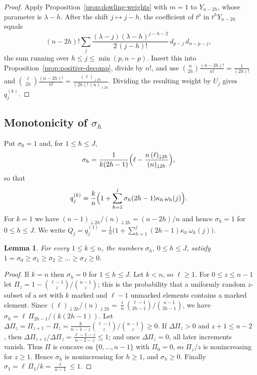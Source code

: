 \documentclass[11pt]{amsart}
\newtheorem{lemma}[theorem]{Lemma}
\theoremstyle{definition}
\theoremstyle{remark}
\numberwithin{equation}{section}
\newcommand{\ff}[2]{(#1)_{\downarrow #2}}
\begin{document}
\begin{proof}
Apply Proposition~\ref{prop:dowling-weights} with $m=1$ to $Y_{n-2h}$, whose parameter is $\lambda-h$. After the shift $j\mapsto j-h$, the coefficient of $t^p$ in $t^hY_{n-2h}$ equals
\[
(n-2h)!\sum_j\frac{(\lambda-j)(\lambda-h)^{j-h-2}}{2\,(j-h)!}\,d_{p-j}\,d_{n-p-j},
\]
the sum running over $h\le j\le\min(p,n-p)$. Insert this into Proposition~\ref{prop:positive-decomp}, divide by $n!$, and use $\binom n{2h}\frac{(n-2h)!}{n!}=\frac1{(2h)!}$ and $\binom\ell{2h}\frac{(n-2h)!}{n!}=\frac{\ff\ell{2h}}{(2h)!\,\ff n{2h}}$. Dividing the resulting weight by $U_j$ gives $q^{(k)}_j$.
\end{proof}

\subsection{Monotonicity of \texorpdfstring{$\sigma_h$}{sigma\_h}}
Put $\sigma_0=1$ and, for $1\le h\le J$,
\[
\sigma_h=\frac{1}{k(2h-1)}\Bigl(\ell-\frac{n\,\ff\ell{2h}}{\ff n{2h}}\Bigr),
\]
so that
\begin{equation}\label{eq:qk-sigma}
q^{(k)}_j=\frac kn\Bigl(1+\sum_{h=1}^j\sigma_h(2h-1)\kappa_h\,\omega_h(j)\Bigr).
\end{equation}
For $k=1$ we have $\ff{n-1}{2h}/\ff n{2h}=(n-2h)/n$ and hence $\sigma_h=1$ for $0\le h\le J$. We write $Q_j=q^{(1)}_j=\frac1n\bigl(1+\sum_{h=1}^j(2h-1)\kappa_h\,\omega_h(j)\bigr)$.

\begin{lemma}\label{lem:attenuation}
For every $1\le k\le n$, the numbers $\sigma_h$, $0\le h\le J$, satisfy $1=\sigma_0\ge\sigma_1\ge\sigma_2\ge\dots\ge\sigma_J\ge0$.
\end{lemma}

\begin{proof}
If $k=n$ then $\sigma_h=0$ for $1\le h\le J$. Let $k<n$, so $\ell\ge1$. For $0\le z\le n-1$ let $\Pi_z=1-\binom{\ell-1}z/\binom{n-1}z$; this is the probability that a uniformly random $z$-subset of a set with $k$ marked and $\ell-1$ unmarked elements contains a marked element. Since $\ff\ell{2h}/\ff n{2h}=\frac\ell n\binom{\ell-1}{2h-1}/\binom{n-1}{2h-1}$, we have $\sigma_h=\ell\,\Pi_{2h-1}/(k(2h-1))$. Let $\Delta\Pi_z=\Pi_{z+1}-\Pi_z=\frac{k}{n-1-z}\binom{\ell-1}z/\binom{n-1}z\ge0$. If $\Delta\Pi_z>0$ and $z+1\le n-2$, then $\Delta\Pi_{z+1}/\Delta\Pi_z=\frac{\ell-1-z}{n-2-z}\le1$; and once $\Delta\Pi_z=0$, all later increments vanish. Thus $\Pi$ is concave on $\{0,\dots,n-1\}$ with $\Pi_0=0$, so $\Pi_z/z$ is nonincreasing for $z\ge1$. Hence $\sigma_h$ is nonincreasing for $h\ge1$, and $\sigma_h\ge0$. Finally $\sigma_1=\ell\,\Pi_1/k=\frac\ell{n-1}\le1$.
\end{proof}
\end{document}
